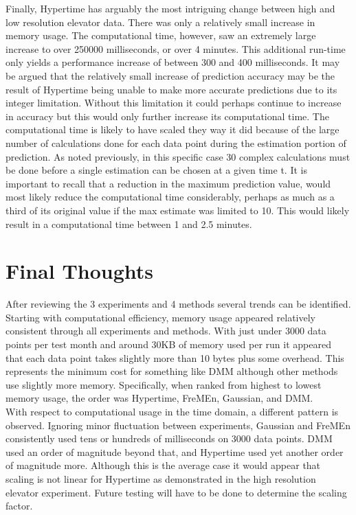 Finally, Hypertime has arguably the most intriguing change between high and low
resolution elevator data. There was only a relatively small increase in memory usage. The computational time, however, saw an
extremely large increase to over 250000 milliseconds, or over 4 minutes. This
additional run-time only yields a performance increase of between 300 and 400
milliseconds. It may be argued that the relatively small increase of prediction
accuracy may be the result of Hypertime being unable to make more accurate
predictions due to its integer limitation. Without this limitation it could
perhaps continue to increase in accuracy but this would only further increase its
computational time. The computational time is likely to have scaled they way it did because of
the large number of calculations done for each data point during the
estimation portion of prediction. As noted previously, in this specific case
30 complex calculations must be done before a single estimation can be chosen at
a given time t. It is important to recall that a reduction in the maximum
prediction value, would most likely reduce the
computational time considerably, perhaps as much as a third of its original
value if the max estimate was limited to 10. This would likely result in a
computational time between 1 and 2.5 minutes. \\


\section{ Final Thoughts }

After reviewing the 3 experiments and 4 methods several trends can be
identified. Starting with computational efficiency, memory usage appeared
relatively consistent through all experiments and methods. With just under 3000
data points per test month and around 30KB of memory used per run
it appeared that each data point takes slightly more than 10 bytes plus
some overhead. This represents the minimum cost for something like DMM although
other methods use slightly more memory. Specifically, when ranked from highest to lowest memory usage,
the order was Hypertime, FreMEn, Gaussian, and DMM. \\

With respect to computational usage in the time domain, a different pattern is
observed. Ignoring minor fluctuation between experiments, Gaussian and FreMEn
consistently used tens or hundreds of milliseconds on 3000 data points.
DMM used an order of magnitude beyond that, and Hypertime used yet another
order of magnitude more. Although this is the average case it would appear that
scaling is not linear for Hypertime as demonstrated in the high resolution
elevator experiment. Future testing will have to be done to determine the
scaling factor. \\

